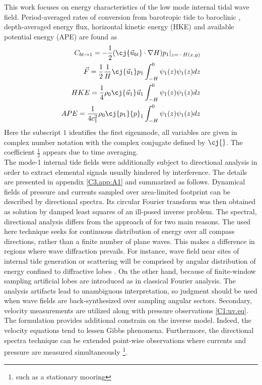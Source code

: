 \documentclass[12pt]{article}
\begin{document}
This work focuses on energy characteristics of the low mode internal tidal wave field. 
Period-averaged rates of conversion from barotropic tide to 
baroclinic \citep{simmons2004internal, kurapov2003m}, depth-averaged energy flux, horizontal 
kinetic energy (HKE) and available potential energy (APE) are found as
\begin{align}
\label{C3.eq:conv}
C_{bt\to 1} = -\frac{1}{2}(\cj{\vec{u}_{bt}} \cdot \nabla H) p_{1}|_{z = -H(x,y)}\\
\vec{F} = \frac{1}{2} \frac{1}{H} \cj{\vec{u}_1} p_1 \int_{-H}^{0} \psi_1(z) \psi_1(z) dz\\
HKE = \frac{1}{4} \rho_0 \cj{\vec{u}_1} \vec{u}_1 \int_{-H}^{0} \psi_1(z) \psi_1(z) dz\\
APE = \frac{1}{4c_1^2} \rho_0 \cj{p_1} {p}_1 \int_{-H}^{0} \psi_1(z) \psi_1(z) dz
\end{align}
Here the subscript $1$ identifies the first eigenmode, all variables are given in complex number 
notation with the complex conjugate defined by $\cj{}$. The coefficient $\frac{1}{2}$ appears due 
to 
time 
averaging.\\

The mode-1 internal tide fields were additionally subject to directional analysis in order to 
extract elemental signals usually hindered by interference. The details are presented in appendix 
\ref{C3.app:A1} and summarized as follows. Dynamical fields of pressure and currents sampled over 
area-limited footprint can be described by directional 
spectra. Its circular Fourier 
transform was then obtained as solution by damped least squares of an ill-posed inverse problem. 
The 
spectral, directional analysis differs from the approach of \cite{zhao2010long} for two main 
reasons. The used here technique seeks for continuous distribution of 
energy over all compass directions, rather than a finite number of plane waves. This makes a 
difference in regions 
where wave diffraction prevails. For instance, wave field near sites of internal tide generation or 
scattering will be comprised by angular distribution of energy confined to diffractive lobes 
\citep[e.g.,][]{munroe2005topographic, johnston2003internal}. On 
the other hand, because of finite-window sampling artificial lobes are introduced as in classical 
Fourier analysis. The analysis artifacts lead to unambiguous interpretation, so judgment should be 
used when wave fields are back-synthesized over sampling angular sectors. Secondary, 
velocity measurements are utilized along with pressure observations \eqref{C1:uv.eq}. The 
formulation provides additional constrain on the inverse model. Indeed, the velocity equations tend 
to lessen Gibbs phenomena. Furthermore, the directional spectra technique can be extended 
point-wise observations where currents and pressure are measured simultaneously  \footnote{such as 
a stationary mooring}.\\
\end{document}
